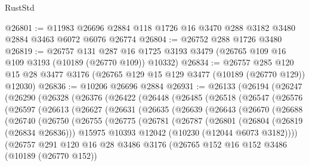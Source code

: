 \begin{lexlean}{RustStd}
\begin{coremodule}
@26801 := @11983 @26696 @2884 @118 @1726 @16 @3470 @288 @3182 @3480 @2884 @3463 @6072 @6076 @26774
@26804 := @26752 @288 @1726 @3480
@26819 := @26757
    @131
    @287
    @16
    @1725
    @3193
    @3479
    (@26765 @109 @16 @109 @3193 (@10189 (@26770 @109)) @10332)
@26834 := @26757
    @285
    @120
    @15
    @28
    @3477
    @3176
    (@26765 @129 @15 @129 @3477 (@10189 (@26770 @129)) @12030)
@26836 := @10206 @26696 @2884
@26931 := @26133
    (@26194
      (@26247
        (@26290
          (@26328
            (@26376
              (@26422
                (@26448
                  (@26485
                    (@26518
                      (@26547
                        (@26576
                          (@26597
                            (@26613
                              (@26627
                                (@26631
                                  (@26635
                                    (@26639
                                      (@26643
                                        (@26670
                                          (@26688
                                            (@26740
                                              (@26750
                                                (@26755
                                                  (@26775
                                                    (@26781
                                                      (@26787
                                                        (@26801
                                                          (@26804 (@26819 (@26834 @26836)))
                                                          @15975
                                                          @10393
                                                          @12042
                                                          (@10230 (@12044 @6073 @3182))))
                                                      (@26757
                                                        @291
                                                        @120
                                                        @16
                                                        @28
                                                        @3486
                                                        @3176
                                                        (@26765
                                                          @152
                                                          @16
                                                          @152
                                                          @3486
                                                          (@10189 (@26770 @152))

\end{coremodule}
\end{lexlean}
